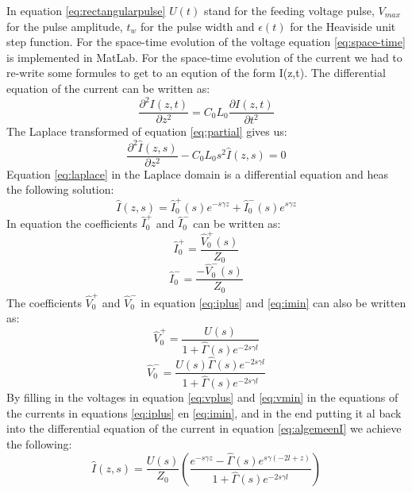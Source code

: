 \documentclass[final]{scrreprt} %
\begin{document}
In equation \ref{eq:rectangularpulse} $U(t)$ stand for the feeding voltage pulse, $V_{max}$ for the pulse amplitude, $t_w$ for the pulse width and $\epsilon(t)$ for the Heaviside unit step function. 
For the space-time evolution of the voltage equation \ref{eq:space-time} is implemented in MatLab. 
For the space-time evolution of the current we had to re-write some formules to get to an eqution of the form I(z,t). 
The differential equation of the current can be written as: 
\begin{equation} \label{eq:partial}
\frac{\partial^2I(z,t)}{\partial z^2}=C_{0}L_{0}\frac{\partial I(z,t)}{\partial t^2}
\end{equation}
The Laplace transformed of equation \ref{eq:partial} gives us:
\begin{equation} \label{eq:laplace}
\frac{\partial^2\hat{I}(z,s)}{\partial z^2} - C_{0}L_{0}s^2\hat{I}(z,s)=0
\end{equation}
Equation \ref{eq:laplace} in the Laplace domain is a differential equation and heas the following solution: 
\begin{equation} \label{eq:algemeen}
\hat{I}(z,s)=\hat{I}^{+}_{0}(s)e^{-s\gamma z} + \hat{I}^{-}_{0}(s)e^{s\gamma z}
\end{equation}
In equation \label{eq:algemeenI} the coefficients $\hat{I}^{+}_{0}$ and $\hat{I}^{-}_{0}$ can be written as:
\begin{equation} \label{eq:iplus}
\hat{I}^{+}_{0}= \frac{\hat{V}^{+}_{0}(s)}{Z_{0}}
\end{equation}
\begin{equation} \label{eq:imin}
\hat{I}^{-}_{0}= \frac{-\hat{V}^{-}_{0}(s)}{Z_{0}}
\end{equation}
The coefficients $\hat{V}^{+}_{0}$ and $\hat{V}^{-}_{0}$ in equation \ref{eq:iplus} and \ref{eq:imin} can also be written as:
\begin{equation} \label{eq:vplus}
\hat{V}^{+}_{0}= \frac{U(s)}{1 + \hat{\Gamma}(s)e^{-2s\gamma l}}
\end{equation}
\begin{equation} \label{eq:vmin}
\hat{V}^{-}_{0}= \frac{U(s)\hat{\Gamma}(s)e^{-2s\gamma l}}{1 + \hat{\Gamma}(s)e^{-2s\gamma l}}
\end{equation}
By filling in the voltages in equation \ref{eq:vplus} and \ref{eq:vmin} in the equations of the currents in equations \ref{eq:iplus} en \ref{eq:imin}, and in the end putting it al back into the differential equation of the current in equation \ref{eq:algemeenI} we achieve the following:
\begin{equation} \label{eq:volledigI}
\hat{I}(z,s)=\frac{U(s)}{Z_{0}}\left(\frac{e^{-s\gamma z} - \hat{\Gamma}(s)e^{s\gamma (-2l+z)}}{1 + \hat{\Gamma}(s)e^{-2s\gamma l}}\right)
\end{equation}
\end{document}
